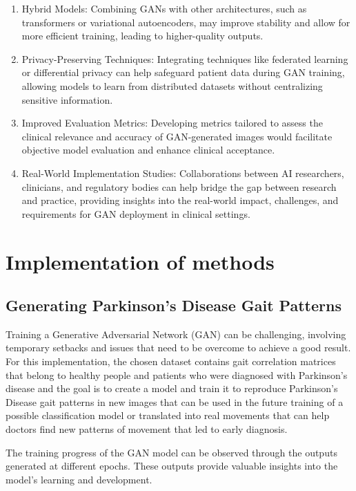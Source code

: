 \documentclass[12pt]{article}
\begin{document}
\begin{enumerate}
    
\item Hybrid Models: Combining GANs with other architectures, such as transformers or variational autoencoders, may improve stability and allow for more efficient training, leading to higher-quality outputs.
\item Privacy-Preserving Techniques: Integrating techniques like federated learning or differential privacy can help safeguard patient data during GAN training, allowing models to learn from distributed datasets without centralizing sensitive information.
\item Improved Evaluation Metrics: Developing metrics tailored to assess the clinical relevance and accuracy of GAN-generated images would facilitate objective model evaluation and enhance clinical acceptance.
\item Real-World Implementation Studies: Collaborations between AI researchers, clinicians, and regulatory bodies can help bridge the gap between research and practice, providing insights into the real-world impact, challenges, and requirements for GAN deployment in clinical settings.
\end{enumerate}

\section{Implementation of methods}

\subsection{Generating Parkinson's Disease Gait Patterns \cite{Ilesan2024}}

Training a Generative Adversarial Network (GAN) can be challenging, involving temporary setbacks and issues that need to be overcome to achieve a good result. For this implementation, the chosen dataset contains gait correlation matrices that belong to healthy people and patients who were diagnosed with Parkinson's disease and the goal is to create a model and train it to reproduce Parkinson's Disease gait patterns in new images that can be used in the future training of a possible classification model or translated into real movements that can help doctors find new patterns of movement that led to early diagnosis.

The training progress of the GAN model can be observed through the outputs generated at different epochs. These outputs provide valuable insights into the model's learning and development.
\end{document}
